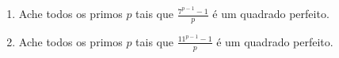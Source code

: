 \begin{enumerate}[label = (\alph*)]
	\item Ache todos os primos $p$ tais que $\frac{7^{p-1} - 1}{p}$ é um quadrado perfeito.
	\item Ache todos os primos $p$ tais que $\frac{11^{p-1} - 1}{p}$ é um quadrado perfeito.
\end{enumerate}
